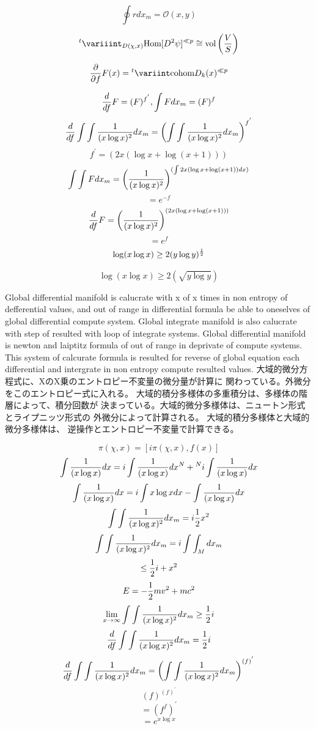 \documentclass{jsarticle}
\begin{document}
{ $$ \oint r dx_m = \mathcal{O}(x,y) $$

 $$ {{}^t \variiint}_{{D(\chi,x)}} \text{Hom}[D^2 \psi]^{\ll p} \cong 
 \text{vol}\left({V \over S}\right) $$

 $$ {\partial \over \partial f}F(x) = {{}^t \variint} 
 \text{cohom}D_k(x)^{\ll p} $$

 $$ {d \over df}F = (F)^{f^{'}}, \int F dx_m = (F)^{f}  $$
 $$ {d \over df}\int \int{1 \over (x \log x)^2}dx_m =
 \left(\int \int{1 \over (x \log x)^2}dx_m \right)^{f^{'}}  $$
 $$ f^{'} = (2x (\log x + \log (x + 1))) $$
  $$  \int \int F dx_m = \left({1 \over (x \log x)^2}\right)^{
	  (\int 2x (\log x + \log (x + 1))dx)} $$ 
   $$= e^{-f} $$
  $$ {d \over df}F = \left({1 \over (x \log x)^2}\right)^{
	  (2x (\log x + \log (x + 1))) } $$  
  $$= e^{f} $$
  $$ \log (x \log x) \ge 2(y \log y)^{1 \over 2} $$

  $$ \log (x \log x) \ge 2(\sqrt{y \log y}) $$

  Global differential manifold is calucrate with x of x times in non
  entropy of defferential values, and out of range in differential formula
  be able to oneselves of global differential compute system.
  Global integrate manifold is also calucrate with step of resulted with
  loop of integrate systems. Global differential manifold is newton and 
  laiptitz formula of out of range in deprivate of compute systems.
  This system of calcurate formula is resulted for reverse of global equation
  each differential and intergrate in non entropy compute resulted values.
  大域的微分方程式に、XのX乗のエントロピー不変量の微分量が計算に
  関わっている。外微分をこのエントロピー式に入れる。
  大域的積分多様体の多重積分は、多様体の階層によって、積分回数が
  決まっている。大域的微分多様体は、ニュートン形式とライプニッツ形式の
  外微分によって計算される。 大域的積分多様体と大域的微分多様体は、
  逆操作とエントロピー不変量で計算できる。


  $$ \pi(\chi,x) = [i\pi(\chi,x),f(x)] $$
  $$ \int{1 \over (x \log x)}dx = i \int{1 \over (x \log x)}dx^{N}  
  + {}^{N} i \int{1 \over (x \log x)}dx $$
  $$  \int{1 \over (x \log x)}dx = i \int{x \log x}dx 
  - \int{1 \over (x \log x)}dx $$
  $$ \int \int{1 \over (x \log x)^2}dx_m = i {1 \over 2}x^2 $$
  $$ \int \int{1 \over (x \log x)^2}dx_m = i \int \int_M dx_m $$
  $$ \le {1 \over 2}i + x^2 $$
  $$ E = - {1 \over 2}mv^2 + mc^2 $$
  $$ \lim_{x \to \infty} \int \int{1 \over (x \log x)^2}dx_m \ge {1 \over 2}i $$
  $$ {d \over df}\int \int{1 \over (x \log x)^2}dx_m = {1 \over 2}i $$
  $$ {d \over df}\int \int{1 \over (x \log x)^2}dx_m = 
  \left(\int \int {1 \over (x \log x)^2}dx_m \right)^{(f)^{'}}$$
  $$ (f)^{(f)^{'}} $$
  $$ = (f^f)^{'} $$
  $$ = e^{x \log x} $$

}
\end{document}
